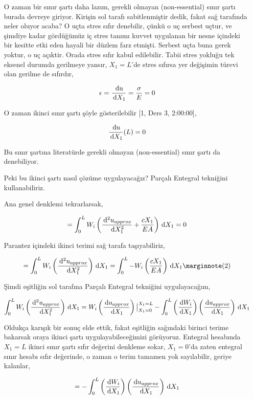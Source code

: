 \documentclass[12pt,fleqn]{article}\usepackage{../../common}
\begin{document}
O zaman bir sınır şartı daha lazım, gerekli olmayan (non-essential) sınır şartı
burada devreye giriyor. Kirişin sol tarafı sabitlenmiştir dedik, fakat sağ
tarafında neler oluyor acaba? O uçta stres sıfır denebilir, çünkü o uç serbest
uçtur, ve şimdiye kadar gördüğümüz iç stres tanımı kuvvet uygulanan bir nesne
içindeki bir kesitte etki eden hayali bir düzlem farz etmişti. Serbest uçta buna
gerek yoktur, o uç açıktir. Orada stres sıfır kabul edilebilir. Tabii stres
yokluğu tek eksenel durumda gerilmeye yansır, $X_1=L$'de stres sıfırsa yer
değişimin türevi olan gerilme de sıfırdır,

$$
\epsilon = \frac{\,\mathrm{d} u}{\,\mathrm{d} X_1} = \frac{\sigma}{E} = 0
$$

O zaman ikinci sınır şartı şöyle gösterilebilir [1, Ders 3, 2:00:00],

$$
\frac{\,\mathrm{d} u}{\,\mathrm{d} X_1}(L) = 0 
$$

Bu sınır şartına literatürde gerekli olmayan (non-essential) sınır şartı da
denebiliyor.

Peki bu ikinci şartı nasıl çözüme uygulayacağız? Parçalı Entegral tekniğini
kullanabiliriz.

Ana genel denklemi tekrarlarsak,

$$
= \int_{0}^{L} W_i \left(
  \frac{\,\mathrm{d}^2 u_{approx}}{\,\mathrm{d} X_1^2} + \frac{c X_1}{EA}
\right) \,\mathrm{d} X_1 = 0
$$

Parantez içindeki ikinci terimi sağ tarafa taşıyabiliriz,

$$
= \int_{0}^{L} W_i \left( \frac{\ud^2 u_{approx}}{\ud X_1^2} \right) \ud X_1 =
\int_{0}^{L} - W_i  \left( \frac{c X_1}{EA} \right) \ud X_1
\mlabel{2}
$$

Şimdi eşitliğin sol tarafına Parçalı Entegral tekniğini uygulayacağım,

$$
\int_{0}^{L} W_i \left( \frac{\,\mathrm{d}^2 u_{approx}}{\,\mathrm{d} X_1^2} \right) \,\mathrm{d} X_1 =
W_i \left( \frac{\,\mathrm{d} u_{approx}}{\,\mathrm{d} X_1} \right) \big\vert_{X_1=0}^{X_1=L} -
\int_{0}^{L} \left( \frac{\,\mathrm{d} W_i}{\,\mathrm{d} X_1}  \right) \left( \frac{\,\mathrm{d} u_{approx}}{\,\mathrm{d} X_1}\right) \,\mathrm{d} X_1
$$

Oldukça karışık bir sonuç elde ettik, fakat eşitliğin sağındaki birinci terime
bakarsak oraya ikinci şartı uygulayabileceğimizi görüyoruz. Entegral hesabında
$X_1=L$ ikinci sınır şartı sıfır değerini denkleme sokar, $X_1=0$'da zaten
entegral sınır hesabı sıfır değerinde, o zaman o terim tamamen yok sayılabilir,
geriye kalanlar,

$$
= - \int_{0}^{L} \left( \frac{\,\mathrm{d} W_i}{\,\mathrm{d} X_1}  \right)
\left( \frac{\,\mathrm{d} u_{approx}}{\,\mathrm{d} X_1}\right) \,\mathrm{d} X_1
$$
\end{document}
